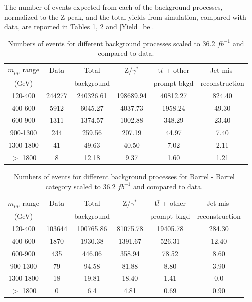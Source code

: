The number of events expected from each of the background processes, normalized to the Z peak, and the total yields from simulation, compared with data, are reported in Tables \ref{Yield}, \ref{Yield_bb} and \ref{Yield_be}. 

\begin{table}[htb]
\begin{center}
\begin{tabular}{c|cc|ccc}
  $m_{\mu\mu}$ range & Data  & Total & Z/$\gamma^{*}$ & t$\bar{t}$ + other & Jet mis-\\
  (GeV) &      &   background   &      &  prompt bkgd    &   reconstruction\\ \hline
  120-400   &	244277	& 240326.61 &	198689.94	&	40812.27	& 824.40\\
  400-600   &	5912	& 6045.27 &	4037.73	&	1958.24	&49.30\\
  600-900   &	1311	& 1374.57 &	1002.88	&	348.29	&23.40\\
  900-1300   &	244	& 259.56 &	207.19	&	44.97	&7.40\\
  1300-1800   &	41	& 49.63 &	40.50 &	7.02	& 2.11\\
  $>$ 1800   &	8	& 12.18 &	9.37	&	1.60	&1.21\\
\end{tabular}
\caption{Numbers of events for different background processes scaled to 36.2 $fb^{-1}$ and compared to data.}
\label{Yield}
\end{center}
\end{table}

\begin{table}[htb]
\begin{center}
\begin{tabular}{c|cc|ccc}
  $m_{\mu\mu}$ range & Data  & Total & Z/$\gamma^{*}$ & t$\bar{t}$ + other & Jet mis-\\
  (GeV) &      &   background   &      &  prompt bkgd    &   reconstruction\\ \hline
  120-400   &	103644	& 100765.86 &	81075.78	&	19405.78	&284.30\\
  400-600   &	1870	&  1930.38 &	1391.67	&	526.31	&12.40\\
  600-900   &	435	& 446.06 &	358.94	&	78.52	&8.60\\
  900-1300   &	79	& 94.58 &	81.88	&	8.80	&3.90\\
  1300-1800   &	18	& 19.81 &	18.40	&	1.41	&0.0\\
  $>$ 1800   &	0	& 6.4 &	4.81	&	0.69	&0.90\\
\end{tabular}
\caption{Numbers of events for different background processes for Barrel - Barrel category scaled to 36.2 $fb^{-1}$ and compared to data.}
\label{Yield_bb}
\end{center}
\end{table}

